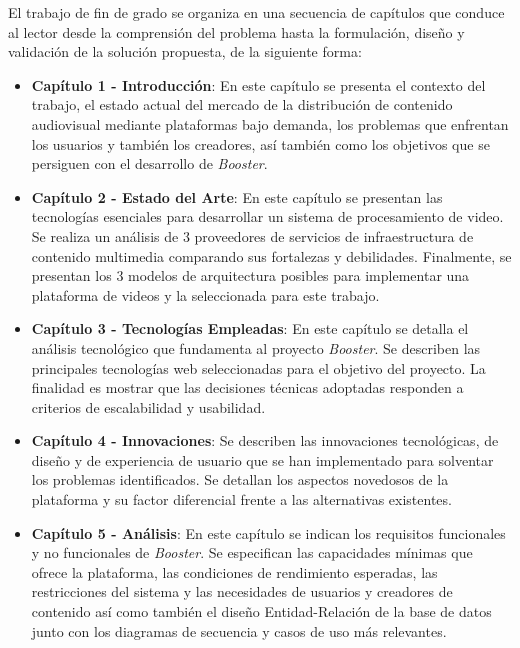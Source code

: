 El trabajo de fin de grado se organiza en una secuencia de capítulos que conduce al lector desde la comprensión del problema hasta la formulación, diseño y validación de la solución propuesta, de la siguiente forma:

\begin{itemize}
  \item \textbf{Capítulo 1 - Introducción}: En este capítulo se presenta el contexto del trabajo, el estado actual del mercado de la distribución de contenido audiovisual mediante plataformas bajo demanda, los problemas que enfrentan los usuarios y también los creadores, así también como los objetivos que se persiguen con el desarrollo de \textit{Booster}.
  
  \item \textbf{Capítulo 2 - Estado del Arte}: En este capítulo se presentan las tecnologías esenciales para desarrollar un sistema de procesamiento de video. Se realiza un análisis de $3$ proveedores de servicios de infraestructura de contenido multimedia comparando sus fortalezas y debilidades. Finalmente, se presentan los $3$ modelos de arquitectura posibles para implementar una plataforma de videos y la seleccionada para este trabajo. 
  
  \item \textbf{Capítulo 3 - Tecnologías Empleadas}: En este capítulo se detalla el análisis tecnológico que fundamenta al proyecto \textit{Booster}. Se describen las principales tecnologías web seleccionadas para el objetivo del proyecto. La finalidad es mostrar que las decisiones técnicas adoptadas responden a criterios de escalabilidad y usabilidad.
  
  \item \textbf{Capítulo 4 - Innovaciones}: Se describen las innovaciones tecnológicas, de diseño y de experiencia de usuario que se han implementado para solventar los problemas identificados. Se detallan los aspectos novedosos de la plataforma y su factor diferencial frente a las alternativas existentes.

  \item \textbf{Capítulo 5 - Análisis}: En este capítulo se indican los requisitos funcionales y no funcionales de \textit{Booster}. Se especifican las capacidades mínimas que ofrece la plataforma, las condiciones de rendimiento esperadas, las restricciones del sistema y las necesidades de usuarios y creadores de contenido así como también el diseño Entidad-Relación de la base de datos junto con los diagramas de secuencia y casos de uso más relevantes.
  

\end{itemize}
